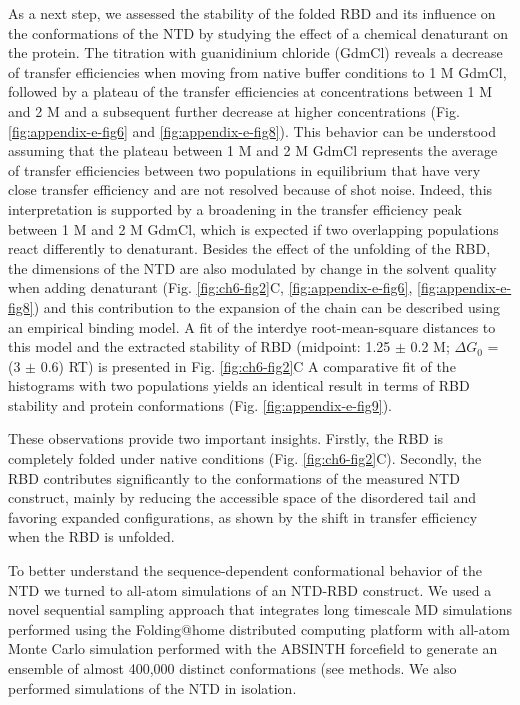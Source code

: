 \documentclass[../main.tex]{subfiles}
\begin{document}
        As a next step, we assessed the stability of the folded RBD and its influence on the conformations of the NTD by studying the effect of a chemical denaturant on the protein. The titration with guanidinium chloride (GdmCl) reveals a decrease of transfer efficiencies when moving from native buffer conditions to 1 M GdmCl, followed by a plateau of the transfer efficiencies at concentrations between 1 M and 2 M and a subsequent further decrease at higher concentrations (Fig. \ref{fig:appendix-e-fig6} and \ref{fig:appendix-e-fig8}). This behavior can be understood assuming that the plateau between 1 M and 2 M GdmCl represents the average of transfer efficiencies between two populations in equilibrium that have very close transfer efficiency and are not resolved because of shot noise. Indeed, this interpretation is supported by a broadening in the transfer efficiency peak between 1 M and 2 M GdmCl, which is expected if two overlapping populations react differently to denaturant. Besides the effect of the unfolding of the RBD, the dimensions of the NTD are also modulated by change in the solvent quality when adding denaturant (Fig. \ref{fig:ch6-fig2}C, \ref{fig:appendix-e-fig6}, \ref{fig:appendix-e-fig8}) and this contribution to the expansion of the chain can be described using an empirical binding model\cite{Schellman1987-tp,Hofmann2012-pz,Borgia2016-oq,Zheng2016-ds,Aznauryan2016-bp}. A fit of the interdye root-mean-square distances to this model and the extracted stability of RBD (midpoint: 1.25 $\pm$ 0.2 M; $\Delta G_0$ = (3 $\pm$ 0.6) RT) is presented in Fig. \ref{fig:ch6-fig2}C A comparative fit of the histograms with two populations yields an identical result in terms of RBD stability and protein conformations (Fig. \ref{fig:appendix-e-fig9}). 

        These observations provide two important insights. Firstly, the RBD is completely folded under native conditions (Fig. \ref{fig:ch6-fig2}C). Secondly, the RBD contributes significantly to the conformations of the measured NTD construct, mainly by reducing the accessible space of the disordered tail and favoring expanded configurations, as shown by the shift in transfer efficiency when the RBD is unfolded.

        To better understand the sequence-dependent conformational behavior of the NTD we turned to all-atom simulations of an NTD-RBD construct. We used a novel sequential sampling approach that integrates long timescale MD simulations performed using the Folding@home distributed computing platform with all-atom Monte Carlo simulation performed with the ABSINTH forcefield to generate an ensemble of almost 400,000 distinct conformations (see methods\cite{Shirts:2000du,Tompa2008-tn}. We also performed simulations of the NTD in isolation.
\end{document}
